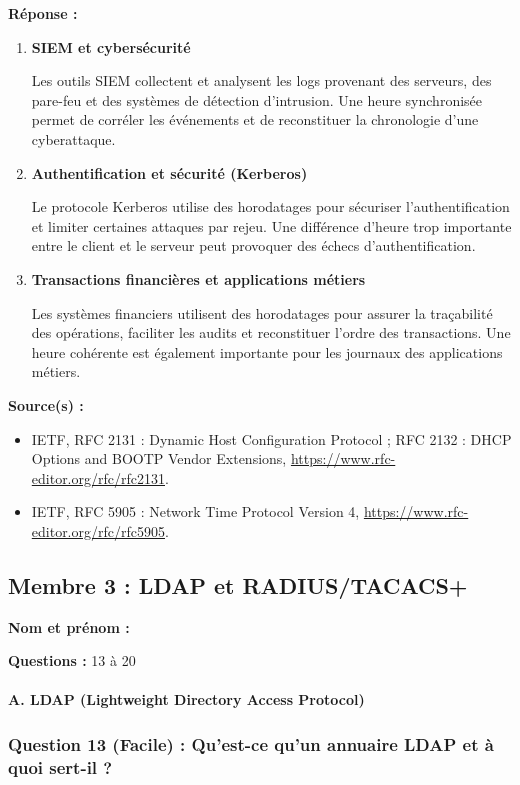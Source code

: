 \documentclass[12pt,a4paper]{article}
\newcommand{\membre}[2]{%
  \textbf{Nom et prénom :} #1 \par
  \textbf{Questions :} #2 \par
}
\newcommand{\reponse}{\textbf{Réponse :}\par}
\newcommand{\sources}{\textbf{Source(s) :}}
\begin{document}
\reponse
\begin{enumerate}
    \item \textbf{SIEM et cybersécurité}

    Les outils SIEM collectent et analysent les logs provenant des
    serveurs, des pare-feu et des systèmes de détection d'intrusion. Une
    heure synchronisée permet de corréler les événements et de
    reconstituer la chronologie d'une cyberattaque.

    \item \textbf{Authentification et sécurité (Kerberos)}

    Le protocole Kerberos utilise des horodatages pour sécuriser
    l'authentification et limiter certaines attaques par rejeu. Une
    différence d'heure trop importante entre le client et le serveur
    peut provoquer des échecs d'authentification.

    \item \textbf{Transactions financières et applications métiers}

    Les systèmes financiers utilisent des horodatages pour assurer la
    traçabilité des opérations, faciliter les audits et reconstituer
    l'ordre des transactions. Une heure cohérente est également
    importante pour les journaux des applications métiers.
\end{enumerate}

\sources
\begin{itemize}
    \item IETF, RFC 2131 : Dynamic Host Configuration Protocol ;
    RFC 2132 : DHCP Options and BOOTP Vendor Extensions,
    \url{https://www.rfc-editor.org/rfc/rfc2131}.
    \item IETF, RFC 5905 : Network Time Protocol Version 4,
    \url{https://www.rfc-editor.org/rfc/rfc5905}.
\end{itemize}

\subsection{Membre 3 : LDAP et RADIUS/TACACS+}
\membre{\dotfill}{13 à 20}

\paragraph{A. LDAP (Lightweight Directory Access Protocol)}

\subsubsection*{Question 13 (Facile) : Qu'est-ce qu'un annuaire LDAP et à quoi sert-il ?}
\end{document}
